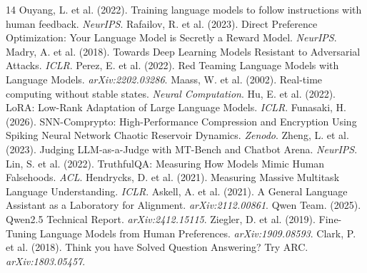 \documentclass[11pt,a4paper]{article}
\begin{document}
\begin{thebibliography}{14}
 Ouyang, L. et al. (2022). Training language models to follow instructions with human feedback. \textit{NeurIPS}.
 Rafailov, R. et al. (2023). Direct Preference Optimization: Your Language Model is Secretly a Reward Model. \textit{NeurIPS}.
 Madry, A. et al. (2018). Towards Deep Learning Models Resistant to Adversarial Attacks. \textit{ICLR}.
 Perez, E. et al. (2022). Red Teaming Language Models with Language Models. \textit{arXiv:2202.03286}.
 Maass, W. et al. (2002). Real-time computing without stable states. \textit{Neural Computation}.
 Hu, E. et al. (2022). LoRA: Low-Rank Adaptation of Large Language Models. \textit{ICLR}.
 Funasaki, H. (2026). SNN-Comprypto: High-Performance Compression and Encryption Using Spiking Neural Network Chaotic Reservoir Dynamics. \textit{Zenodo}.
 Zheng, L. et al. (2023). Judging LLM-as-a-Judge with MT-Bench and Chatbot Arena. \textit{NeurIPS}.
 Lin, S. et al. (2022). TruthfulQA: Measuring How Models Mimic Human Falsehoods. \textit{ACL}.
 Hendrycks, D. et al. (2021). Measuring Massive Multitask Language Understanding. \textit{ICLR}.
 Askell, A. et al. (2021). A General Language Assistant as a Laboratory for Alignment. \textit{arXiv:2112.00861}.
 Qwen Team. (2025). Qwen2.5 Technical Report. \textit{arXiv:2412.15115}.
 Ziegler, D. et al. (2019). Fine-Tuning Language Models from Human Preferences. \textit{arXiv:1909.08593}.
 Clark, P. et al. (2018). Think you have Solved Question Answering? Try ARC. \textit{arXiv:1803.05457}.
\end{thebibliography}
\end{document}
